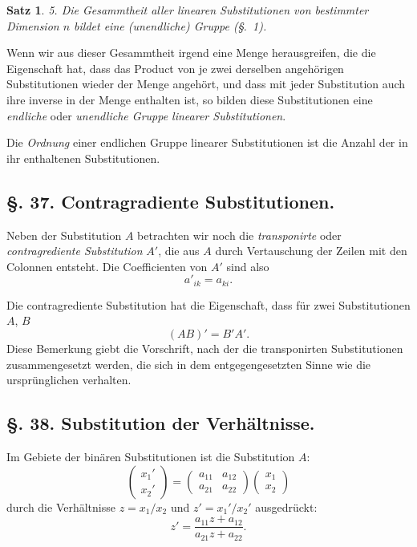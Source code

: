 \documentclass[12pt,a4paper]{article}
\theoremstyle{plain}
\newtheorem{satz}{Satz}[section]
\theoremstyle{definition}
\theoremstyle{remark}
\begin{document}
\begin{satz}
5. Die Gesammtheit aller linearen Substitutionen von bestimmter Dimension $n$ bildet eine (unendliche) Gruppe (\S.~1).
\end{satz}

Wenn wir aus dieser Gesammtheit irgend eine Menge herausgreifen, die die Eigenschaft hat, dass das Product von je zwei derselben angehörigen Substitutionen wieder der Menge angehört, und dass mit jeder Substitution auch ihre inverse in der Menge enthalten ist, so bilden diese Substitutionen eine \emph{endliche} oder \emph{unendliche Gruppe linearer Substitutionen}.

Die \emph{Ordnung} einer endlichen Gruppe linearer Substitutionen ist die Anzahl der in ihr enthaltenen Substitutionen.

\subsection*{\S. 37. Contragradiente Substitutionen.}

Neben der Substitution $A$ betrachten wir noch die \emph{transponirte} oder \emph{contragrediente Substitution} $A'$, die aus $A$ durch Vertauschung der Zeilen mit den Colonnen entsteht. Die Coefficienten von $A'$ sind also
\[
a'_{ik} = a_{ki}.
\]

Die contragrediente Substitution hat die Eigenschaft, dass für zwei Substitutionen $A$, $B$
\[
(AB)' = B'A'.
\]
Diese Bemerkung giebt die Vorschrift, nach der die transponirten Substitutionen zusammengesetzt werden, die sich in dem entgegengesetzten Sinne wie die ursprünglichen verhalten.


\subsection*{\S. 38. Substitution der Verhältnisse.}

Im Gebiete der binären Substitutionen ist die Substitution $A$:
\begin{equation}
\begin{pmatrix} x_{1}' \\ x_{2}' \end{pmatrix} = \begin{pmatrix} a_{11} & a_{12} \\ a_{21} & a_{22} \end{pmatrix} \begin{pmatrix} x_{1} \\ x_{2} \end{pmatrix}
\end{equation}
durch die Verhältnisse $z = x_{1}/x_{2}$ und $z' = x_{1}'/x_{2}'$ ausgedrückt:
\[
z' = \frac{a_{11}z + a_{12}}{a_{21}z + a_{22}}.
\]
\end{document}
